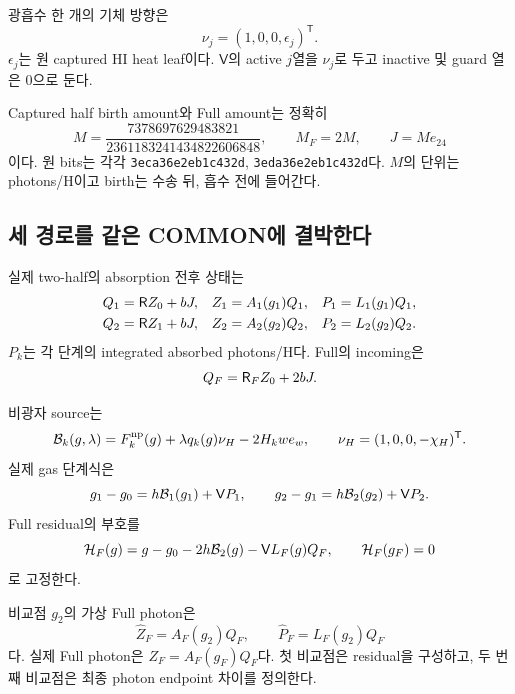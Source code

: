 광흡수 한 개의 기체 방향은
\begin{equation}
\nu_j=(1,0,0,\epsilon_j)^{\mathsf T}.
\label{eq:nu}
\end{equation}
$\epsilon_j$는 원 captured HI heat leaf이다. $\mathsf V$의 active $j$열을 $\nu_j$로 두고 inactive 및 guard 열은 0으로 둔다.

Captured half birth amount와 Full amount는 정확히
\begin{equation}
M=\frac{7378697629483821}{2361183241434822606848},
\qquad M_F=2M,\qquad J=Me_{24}
\label{eq:birth}
\end{equation}
이다. 원 bits는 각각 \texttt{3eca36e2eb1c432d}, \texttt{3eda36e2eb1c432d}다. $M$의 단위는 photons/H이고 birth는 수송 뒤, 흡수 전에 들어간다.\cite{bindings}

\subsection{세 경로를 같은 COMMON에 결박한다}
실제 two-half의 absorption 전후 상태는
\begin{align}
Q_1&=\mathsf R Z_0+bJ,&
Z_1&=A_1(g_1)Q_1,&
P_1&=L_1(g_1)Q_1,\label{eq:stage1}\\
Q_2&=\mathsf R Z_1+bJ,&
Z_2&=A_2(g_2)Q_2,&
P_2&=L_2(g_2)Q_2.
\label{eq:stage2}
\end{align}
$P_k$는 각 단계의 integrated absorbed photons/H다. Full의 incoming은
\begin{equation}
Q_F=\mathsf R_F Z_0+2bJ.
\label{eq:qfull}
\end{equation}

비광자 source는
\begin{equation}
\mathcal B_k(g,\lambda)
=F_k^{\rm np}(g)+\lambda q_k(g)\nu_H-2H_k we_w,\qquad
\nu_H=(1,0,0,-\chi_H)^{\mathsf T}.
\label{eq:bgas}
\end{equation}
실제 gas 단계식은
\begin{equation}
g_1-g_0=h\mathcal B_1(g_1)+\mathsf VP_1,\qquad
g_2-g_1=h\mathcal B_2(g_2)+\mathsf VP_2.
\label{eq:gassteps}
\end{equation}
Full residual의 부호를
\begin{equation}
\mathcal H_F(g)=g-g_0-2h\mathcal B_2(g)-\mathsf V L_F(g)Q_F,\qquad
\mathcal H_F(g_F)=0
\label{eq:fullresidual}
\end{equation}
로 고정한다.

비교점 $g_2$의 가상 Full photon은
\begin{equation}
\widehat Z_F=A_F(g_2)Q_F,\qquad
\widehat P_F=L_F(g_2)Q_F
\label{eq:virtualfull}
\end{equation}
다. 실제 Full photon은 $Z_F=A_F(g_F)Q_F$다. 첫 비교점은 residual을 구성하고, 두 번째 비교점은 최종 photon endpoint 차이를 정의한다.


